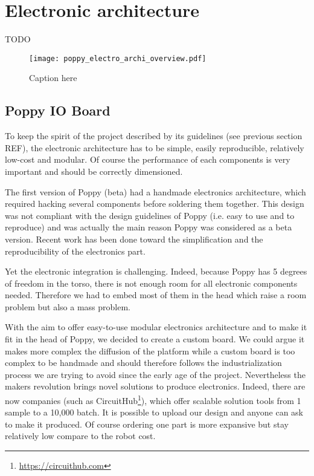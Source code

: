 
\section{Electronic architecture} %

TODO

\begin{figure}[tb]
    \begin{center}
        \texttt{[image: poppy\_electro\_archi\_overview.pdf]}
    \end{center}
    \caption{Caption here}
    \label{fig:figure1}
\end{figure}



\subsection{Poppy IO Board} %

To keep the spirit of the project described by its guidelines (see previous section REF), the electronic architecture has to be simple, easily reproducible, relatively low-cost and modular. Of course the performance of each components is very important and should be correctly dimensioned.

The first version of Poppy (beta) had a handmade electronics architecture, which required hacking several components before soldering them together. This design was not compliant with the design guidelines of Poppy (i.e. easy to use and to reproduce) and was actually the main reason Poppy was considered as a beta version. Recent work has been done toward the simplification and the reproducibility of the electronics part.

Yet the electronic integration is challenging. Indeed, because Poppy has 5 degrees of freedom in the torso, there is not enough room for all electronic components needed. Therefore we had to embed most of them in the head which raise a room problem but also a mass problem.

With the aim to offer easy-to-use modular electronics architecture and to make it fit in the head of Poppy, we decided to create a custom board. We could argue it makes more complex the diffusion of the platform while a custom board is too complex to be handmade and should therefore follows the industrialization process we are trying to avoid since the early age of the project. Nevertheless the makers revolution brings novel solutions to produce electronics. Indeed, there are now companies (such as CircuitHub\footnote{\url{https://circuithub.com}}), which offer scalable solution tools from 1 sample to a 10,000 batch. It is possible to upload our design and anyone can ask to make it produced. Of course ordering one part is more expansive but stay relatively low compare to the robot cost.

